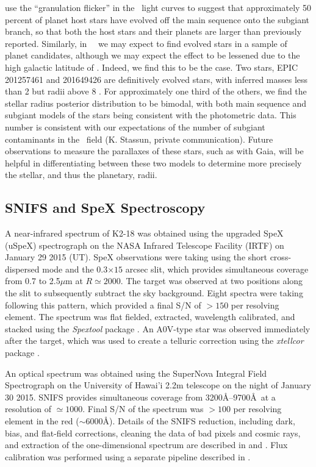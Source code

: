\citet{Bastien14} use the ``granulation flicker'' in the \kep\ light curves
to suggest that
approximately 50 percent of planet host stars have evolved off the
main sequence onto the subgiant branch, so that both the host stars and their
planets are larger than previously reported.
Similarly, in \KT\ \Ci\ we may expect to find evolved stars in a sample of planet
candidates, although we may expect the effect to be lessened due to the
high galactic latitude of \Ci.
Indeed, we find this to be the case.
Two stars, EPIC 201257461 and 201649426 are definitively evolved stars,
with inferred masses less than 2 \msun but radii above 8 \rsun.
For approximately one third of the others,
we find the stellar radius posterior distribution to be bimodal, with both main
sequence and subgiant models of the stars being consistent with the photometric
data.
This number is consistent with our expectations of the number of subgiant
contaminants in the \Ci\ field (K. Stassun, private communication).
Future observations to measure the parallaxes of these stars, such as with Gaia,
will be helpful in differentiating between these two models to determine
more precisely the stellar, and thus the planetary, radii.






\subsection{SNIFS and SpeX Spectroscopy}
\label{Spexobs}


A near-infrared spectrum of K2-18 was obtained using the upgraded SpeX
(uSpeX) spectrograph \citep{Rayner03} on the NASA Infrared Telescope Facility
(IRTF) on January 29 2015 (UT).
SpeX observations were taking using the short cross-dispersed mode and the
0.3$\times15$ arcsec slit, which provides simultaneous coverage from 0.7
to 2.5$\mu$m at $R\simeq2000$.
The target was observed at two positions along the slit to subsequently subtract
the sky background. Eight spectra were taking following this pattern, which provided
a final S/N of $>150$ per resolving element.
The spectrum was flat fielded, extracted, wavelength calibrated, and stacked
using the \textit{Spextool} package \citep{Cushing04}.
An A0V-type star was observed immediately after
the target, which was used to create a telluric correction using the
\textit{xtellcor} package \citep{Vacca03}.

An optical spectrum was obtained using the SuperNova Integral Field Spectrograph
\citep[SNIFS,][]{Aldering02,Lantz04} on the University of Hawai'i
2.2m telescope on the night of January 30 2015.
SNIFS provides simultaneous coverage from 3200\AA--9700\AA\ at a resolution
of $\simeq1000$. Final S/N of the spectrum was $>100$ per resolving element
in the red ($\sim6000$\AA).
Details of the SNIFS reduction, including dark, bias, and flat-field corrections,
cleaning the data of bad pixels and cosmic rays, and extraction of the
one-dimensional spectrum are described in \citet{Bacon01} and
\citet{Aldering06}.
Flux calibration was performed using a separate pipeline described in \citet{Mann15}.

